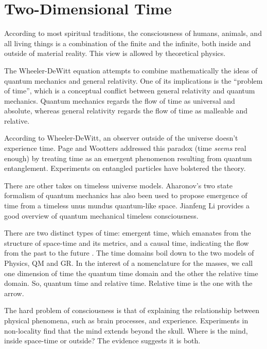 \section{\label{sec:level1}Two-Dimensional Time}

According to most spiritual traditions, the consciousness of humans, animals,
and all living things is a combination of the finite and the infinite,
both inside and outside of material reality.
This view is allowed by theoretical physics.

The Wheeler-DeWitt equation \cite{DeWitt} attempts to combine mathematically
the ideas of quantum mechanics and general relativity.
One of its implications is the ``problem of time'',
which is a conceptual conflict between general relativity and quantum mechanics.
Quantum mechanics regards the flow of time as universal and absolute, whereas
general relativity regards the flow of time as malleable and relative.

According to Wheeler-DeWitt, an observer outside of the universe
doesn't experience time. Page and Wootters \cite{Page} addressed this paradox
(time \textit{seems} real enough) by treating time as an emergent phenomenon
resulting from quantum entanglement.
Experiments \cite{Moreva} on entangled particles have bolstered the theory.

There are other takes on timeless universe models.
Aharonov's two state formalism of quantum mechanics has also been used
\cite{Lobo} to propose emergence of time from a timeless unus mundus
quantum-like space.
Jianfeng Li provides a good overview \cite{Jianfeng} of quantum mechanical
timeless consciousness.

There are two distinct types of time: emergent time, which emanates from the
structure of space-time and its metrics, and a causal time, indicating the flow
from the past to the future \cite{Brunet}. The time domains boil down to the
two models of Physics, QM and GR.
In the interest of a nomenclature for the masses, we call one dimension of time
the quantum time domain and the other the relative time domain.
So, quantum time and relative time. Relative time is the one with the arrow.

The hard problem of consciousness \cite{Chalmers} is that of explaining the
relationship between physical phenomena, such as brain processes,
and experience.
Experiments in non-locality \cite{Achterberg} find that the mind extends beyond
the skull. Where is the mind, inside space-time or outside?
The evidence suggests it is both.

